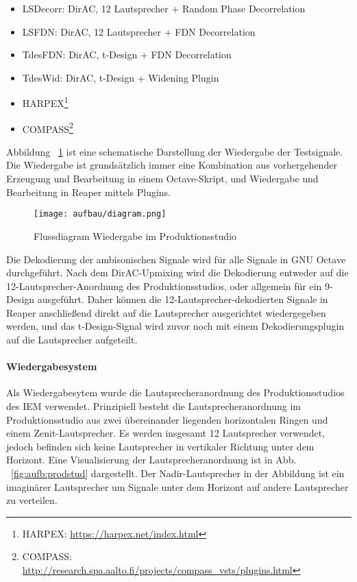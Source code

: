 \begin{itemize}
	\item LSDecorr: DirAC, 12 Lautsprecher + Random Phase Decorrelation
	\item LSFDN: DirAC, 12 Lautsprecher + FDN Decorrelation
	\item TdesFDN: DirAC, t-Design + FDN Decorrelation
	\item TdesWid: DirAC, t-Design + Widening Plugin
	\item HARPEX\footnote{HARPEX: \url{https://harpex.net/index.html}}
	\item COMPASS\footnote{COMPASS: \url{http://research.spa.aalto.fi/projects/compass_vsts/plugins.html}}
\end{itemize}




Abbildung ~\ref{fig:algos} ist eine schematische Darstellung der Wiedergabe der Testsignale. Die Wiedergabe ist grundsätzlich immer eine Kombination aus vorhergehender Erzeugung und Bearbeitung in einem Octave-Skript, und Wiedergabe und Bearbeitung in Reaper mittels Plugins.

\begin{figure}[!ht]
  \centering
  \texttt{[image: aufbau/diagram.png]}
  \caption{Flussdiagram Wiedergabe im Produktionsstudio}
  	\label{fig:algos}
\end{figure}

Die Dekodierung der ambisonischen Signale wird für alle Signale in GNU Octave durchgeführt. Nach dem DirAC-Upmixing wird die Dekodierung entweder auf die 12-Lautsprecher-Anordnung des Produktionsstudios, oder allgemein für ein 9-Design ausgeführt. Daher können die 12-Lautsprecher-dekodierten Signale in Reaper anschließend direkt auf die Lautsprecher ausgerichtet wiedergegeben werden, und das t-Design-Signal wird zuvor noch mit einem Dekodierungsplugin auf die Lautsprecher aufgeteilt.

\paragraph{Wiedergabesystem}
Als Wiedergabesytem wurde die Lautsprecheranordnung des Produktionsstudios des IEM verwendet. Prinzipiell besteht die Lautsprecheranordnung im Produktionsstudio aus zwei übereinander liegenden horizontalen Ringen und einem Zenit-Lautsprecher. Es werden insgesamt 12 Lautsprecher verwendet, jedoch befinden sich keine Lautsprecher in vertikaler Richtung unter dem Horizont. Eine Visualisierung der Lautsprecheranordnung ist in Abb. ~\ref{fig:aufb:prodstud} dargestellt. Der Nadir-Lautsprecher in der Abbildung ist ein imaginärer Lautsprecher um Signale unter dem Horizont auf andere Lautsprecher zu verteilen.

